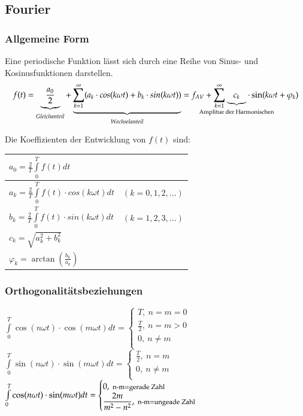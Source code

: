 \subsection{Fourier}
\subsubsection{Allgemeine Form}
Eine periodische Funktion lässt sich durch eine Reihe von Sinus- und Kosinusfunktionen darstellen.
$$f(t) = \underbrace{\frac{a_{0}}{2}}_{Gleichanteil}+\underbrace{\sum_{k = 1}^{\infty} (a_{k} \cdot cos(k \omega t)+ b_{k} \cdot sin(k \omega t))}_{Wechselanteil} = f_{AV}+ \sum_{k = 1}^{\infty} \underbrace{c_k}_{\makebox[0pt]{\text{\scriptsize Amplitue der Harmonischen}}} \cdot \sin(k\omega t + \varphi_k)$$

\begin{minipage}{0.5\linewidth}
    Die Koeffizienten der Entwicklung von $f(t)$ sind: \vfill
    \begin{tabular}{|ll|}
        \hline
        $a_{0} = \frac{2}{T}\int\limits_{0}^{T}f(t)dt$ & \\
        \hline
        $a_{k} = \frac{2}{T}\int\limits_{0}^{T}f(t) \cdot cos(k \omega t)dt$   &
         $(k = 0,1,2,...)$\\
        \hline
        $b_{k} = \frac{2}{T}\int\limits_{0}^{T}f(t) \cdot sin(k \omega t)dt$   &
         $(k = 1,2,3,...)$\\
        \hline
        $c_{k} = \sqrt{a_k^2 + b_k^2}$ &\\
        \hline
        $\varphi_k = \arctan(\frac{b_k}{a_k}) $&\\
        \hline
    \end{tabular}
\end{minipage}
\begin{minipage}{0.5\linewidth}
    \subsubsection{Orthogonalitätsbeziehungen}
    $\int\limits_0^T \cos(n\omega t)\cdot \cos(m\omega t)dt=
    \begin{cases}
    T,\ n=m=0\\
    \frac{T}{2},\ n=m>0\\ 
    0,\ n\neq m\\
    \end{cases}$\\
    
    
    $\int\limits_0^T \sin(n\omega t)\cdot \sin(m\omega t)dt=
    \begin{cases}
    \frac{T}{2},\ n=m\\
    0,\ n\neq m\\
    \end{cases}$\\
    $\int\limits_0^T \cos(n\omega t)\cdot \sin(m\omega t)dt=
    \begin{cases}
    0,\ \text{\footnotesize n-m=gerade Zahl}\\
    \dfrac{2m}{m^2-n^2},\ \text{{\footnotesize n-m=ungeade Zahl}}\\
    \end{cases}$
\end{minipage}

